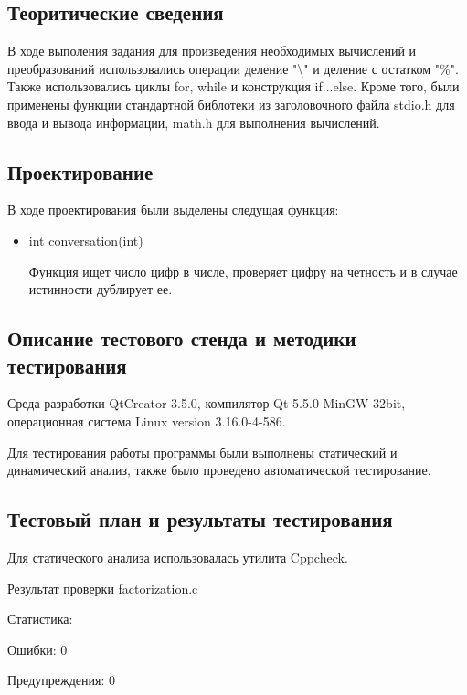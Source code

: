 \documentclass[12pt,a4paper]{report}
\begin{document}
\subsection{Теоритические сведения}

В ходе выполения задания для произведения необходимых вычислений и преобразований использовались операции деление "\textbackslash" и деление с остатком "\%". Также использовались циклы for, while и конструкция if...else. Кроме того, были применены функции стандартной библотеки из заголовочного файла stdio.h для ввода и вывода информации, math.h для выполнения вычислений.


\subsection{Проектирование}

В ходе проектирования были выделены следущая функция:

\begin{itemize}
	\item int conversation(int)

	Функция ищет число цифр в числе, проверяет цифру на четность и в случае истинности дублирует ее.
\end{itemize}


\subsection{Описание тестового стенда и методики тестирования}

Среда разработки QtCreator 3.5.0, компилятор Qt 5.5.0 MinGW 32bit, операционная система Linux version 3.16.0-4-586.

Для тестирования работы программы были выполнены статический и динамический анализ, также было проведено автоматической тестирование.

\subsection{Тестовый план и результаты тестирования}

	Для статического анализа использовалась утилита Cppcheck.
	
	\vspace{\baselineskip}
	Результат проверки factorization.c 
	
	Статистика:
	
	Ошибки:	0
	
	Предупреждения:	0
	
\end{document}
